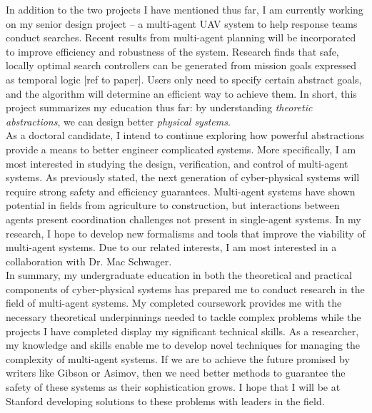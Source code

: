 \documentclass[]{article}
\begin{document}
In addition to the two projects I have mentioned thus far, I am currently working on my senior design project -- a multi-agent UAV system to help response teams conduct searches. Recent results from multi-agent planning will be incorporated to improve efficiency and robustness of the system. Research finds that safe, locally optimal search controllers can be generated from mission goals expressed as temporal logic [ref to paper]. Users only need to specify certain abstract goals, and the algorithm will determine an efficient way to achieve them. In short, this project summarizes my education thus far: by understanding \emph{theoretic abstractions}, we can design better \emph{physical systems}.\\

As a doctoral candidate, I intend to continue exploring how powerful abstractions provide a means to better engineer complicated systems. More specifically, I am most interested in studying the design, verification, and control of multi-agent systems. As previously stated, the next generation of cyber-physical systems will require strong safety and efficiency guarantees. Multi-agent systems have shown potential in fields from agriculture to construction, but interactions between agents present coordination challenges not present in single-agent systems. In my research, I hope to develop new formalisms and tools that improve the viability of multi-agent systems. Due to our related interests, I am most interested in a collaboration with Dr. Mac Schwager.\\

In summary, my undergraduate education in both the theoretical and practical components of cyber-physical systems has prepared me to conduct research in the field of multi-agent systems. My completed coursework provides me with the necessary theoretical underpinnings needed to tackle complex problems while the projects I have completed display my significant technical skills. As a researcher, my knowledge and skills enable me to develop novel techniques for managing the complexity of multi-agent systems. If we are to achieve the future promised by writers like Gibson or Asimov, then we need better methods to guarantee the safety of these systems as their sophistication grows. I hope that I will be at Stanford developing solutions to these problems with leaders in the field.

\pagebreak
\end{document}
